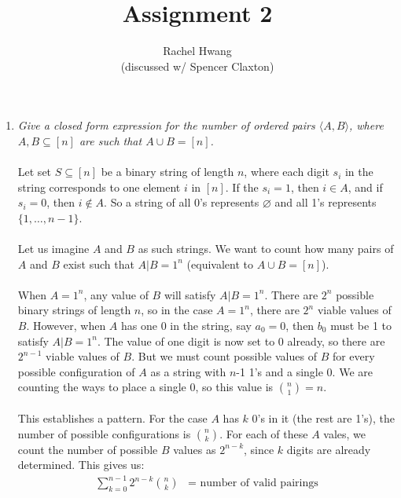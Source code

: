 \documentclass[12pt]{article}
\title{Assignment 2}
\author{Rachel Hwang\\ 
(discussed w/ Spencer Claxton)}
\begin{document}
\maketitle

\begin{enumerate}
\item \emph{Give a closed form expression for the number of ordered pairs $\langle A, B\rangle$, where $A, B \subseteq [n]$ are such that $A \cup B = [n]$.} \\
\\
Let set $S \subseteq [n]$ be a binary string of length $n$, where each digit $s_{i}$ in the string corresponds to one element $i$ in $[n]$. If the $s_{i} = 1$, then $i \in A$, and if $s_{i} = 0$, then $i \notin A$. So a string of all 0's represents $\varnothing$ and all 1's represents $\{1,\dots,n-1\}$.\\
\\
Let us imagine $A$ and $B$ as such strings. We want to count how many pairs of $A$ and $B$ exist such that $A | B = 1^{n}$ (equivalent to $A \cup B = [n]$). \\
\\
When $A = 1^n$, any value of $B$ will satisfy $A | B = 1^{n}$. There are $2^n$ possible binary strings of length $n$, so in the case $A = 1^n$, there are $2^n$ viable values of $B$. However, when $A$ has one 0 in the string, say $a_0 = 0$, then $b_0$ must be 1 to satisfy $A|B = 1^n$. The value of one digit is now set to 0 already, so there are $2^{n-1}$ viable values of $B$. But we must count possible values of $B$ for every possible configuration of $A$ as a string with $n$-1 1's and a single 0. We are counting the ways to place a single 0, so this value is $\binom{n}{1} = n$.\\
\\
This establishes a pattern. For the case $A$ has $k$ 0's in it (the rest are 1's), the number of possible configurations is $\binom{n}{k}$. For each of these $A$ vales, we count the number of possible $B$ values as $2^{n-k}$, since $k$ digits are already determined. This gives us: \\
\begin{align*}
\displaystyle \sum_{k=0}^{n-1} 2^{n-k}\binom{n}{k} &= \text{ number of valid pairings}
\end{align*}
\\



\end{enumerate}
\end{document}
